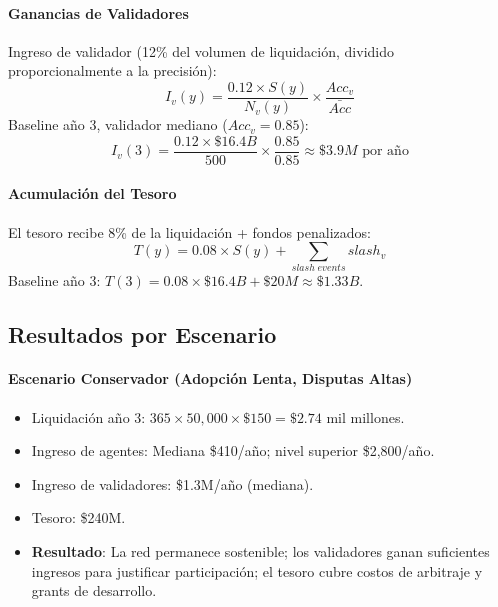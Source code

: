\documentclass[11pt]{article}
\begin{document}
\paragraph{Ganancias de Validadores} Ingreso de validador (12\% del volumen de liquidación, dividido proporcionalmente a la precisión):
\begin{equation}
I_v(y) = \frac{0.12 \times S(y)}{N_v(y)} \times \frac{Acc_v}{\bar{Acc}}
\end{equation}
Baseline año 3, validador mediano ($Acc_v = 0.85$):
\begin{equation}
I_v(3) = \frac{0.12 \times \$16.4B}{500} \times \frac{0.85}{0.85} \approx \$3.9M \text{ por año}
\end{equation}

\paragraph{Acumulación del Tesoro} El tesoro recibe 8\% de la liquidación + fondos penalizados:
\begin{equation}
T(y) = 0.08 \times S(y) + \sum_{slash \; events} slash_v
\end{equation}
Baseline año 3: $T(3) = 0.08 \times \$16.4B + \$20M \approx \$1.33B$.

\subsection{Resultados por Escenario}
\paragraph{Escenario Conservador (Adopción Lenta, Disputas Altas)}
\begin{itemize}[noitemsep]
  \item Liquidación año 3: $365 \times 50{,}000 \times \$150 = \$2.74$ mil millones.
  \item Ingreso de agentes: Mediana \$410/año; nivel superior \$2{,}800/año.
  \item Ingreso de validadores: \$1.3M/año (mediana).
  \item Tesoro: \$240M.
  \item \textbf{Resultado}: La red permanece sostenible; los validadores ganan suficientes ingresos para justificar participación; el tesoro cubre costos de arbitraje y grants de desarrollo.
\end{itemize}
\end{document}
